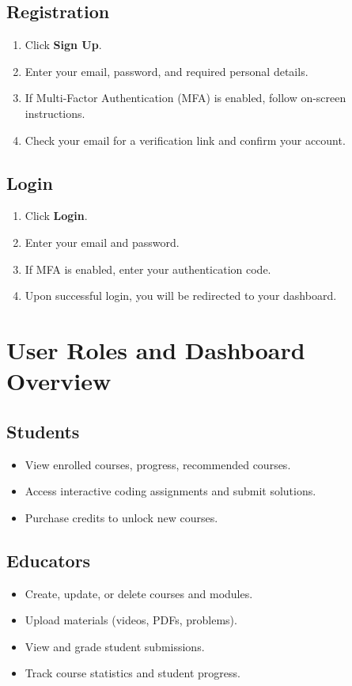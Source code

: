 \documentclass[a4paper,11pt]{scrartcl}
\begin{document}
\subsection{Registration}
\begin{enumerate}[leftmargin=*]
    \item Click \textbf{Sign Up}.
    \item Enter your email, password, and required personal details.
    \item If Multi-Factor Authentication (MFA) is enabled, follow on-screen instructions.
    \item Check your email for a verification link and confirm your account.
\end{enumerate}

\subsection{Login}
\begin{enumerate}[leftmargin=*]
    \item Click \textbf{Login}.
    \item Enter your email and password.
    \item If MFA is enabled, enter your authentication code.
    \item Upon successful login, you will be redirected to your dashboard.
\end{enumerate}

\section{User Roles and Dashboard Overview}

\subsection{Students}
\begin{itemize}[leftmargin=*]
    \item View enrolled courses, progress, recommended courses.
    \item Access interactive coding assignments and submit solutions.
    \item Purchase credits to unlock new courses.
\end{itemize}

\subsection{Educators}
\begin{itemize}[leftmargin=*]
    \item Create, update, or delete courses and modules.
    \item Upload materials (videos, PDFs, problems).
    \item View and grade student submissions.
    \item Track course statistics and student progress.
\end{itemize}
\end{document}
